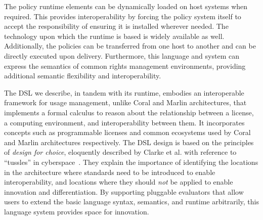 The policy runtime elements can be dynamically loaded on host systems when required.  This provides interoperability by forcing the policy system itself to accept the responsibility of ensuring it is installed wherever needed.  The technology upon which the runtime is based is widely available as well.  Additionally, the policies can be transferred from one host to another and can be directly executed upon delivery.  Furthermore, this language and system can express the semantics of common rights management environments, providing additional semantic flexibility and interoperability.

The DSL we describe, in tandem with its runtime, embodies an interoperable framework for usage management, unlike Coral and Marlin architectures, that implements a formal calculus to reason about the relationship between a license, a computing environment, and interoperability between them. It incorporates concepts such as programmable licenses and common ecosystems used by Coral and Marlin architectures respectively. The DSL design is based on the principles of {\em design for choice}, eloquently described by Clarke et al. with reference to ``tussles'' in cyberspace~\cite{ClWrSoBr:02}. They explain the importance of identifying the locations in the architecture where standards need to be introduced to enable interoperability, and locations where they should {\em not} be applied to enable innovation and differentiation.  By supporting pluggable evaluators that allow users to extend the basic language syntax, semantics, and runtime arbitrarily, this language system provides space for innovation.
